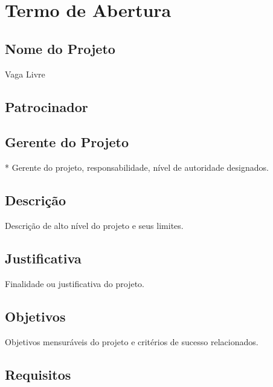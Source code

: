 \section{Termo de Abertura}

\subsection{Nome do Projeto}

Vaga Livre

\subsection{Patrocinador}

\projectSponsorName


\subsection{Gerente do Projeto}

\projectManagerName

* Gerente do projeto, responsabilidade, nível de autoridade designados.

\subsection{Descrição}

Descrição de alto nível do projeto e seus limites.

\subsection{Justificativa}

Finalidade ou justificativa do projeto.

\subsection{Objetivos}

Objetivos mensuráveis do projeto e critérios de sucesso relacionados.

\subsection{Requisitos}

